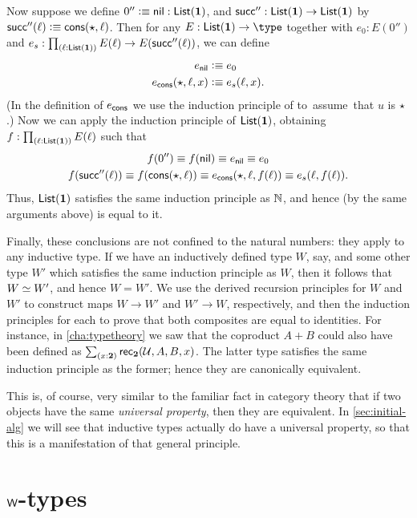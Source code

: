 Now suppose we define $0'' \vcentcolon\equiv \mathsf{nil}: \mathsf{List}(\mathbf{1})$, and $\mathsf{succ}'':\mathsf{List}(\mathbf{1})\to\mathsf{List}(\mathbf{1})$ by $\mathsf{succ}''(\ell) \vcentcolon\equiv \mathsf{cons}(\star,\ell)$.
Then for any $E:\lst\unit\to\type$ together with $e_0:E(0'')$ and $e_s:\prd{\ell:\lst\unit} E(\ell) \to E(\suc''(\ell))$, we can define
\begin{align*}
  e_{\mathsf{nil}} &\vcentcolon\equiv e_0\\
  e_{\mathsf{cons}}(\star,\ell,x) &\vcentcolon\equiv e_s(\ell,x).
\end{align*}
(In the definition of $e_{\mathsf{cons}}$ we use the induction principle of \unit to assume that $u$ is $\star$.)
Now we can apply the induction principle of $\mathsf{List}(\mathbf{1})$, obtaining $f:\prd{\ell:\lst\unit} E(\ell)$ such that
\begin{gather*}
  f(0'') \equiv f(\mathsf{nil}) \equiv e_{\mathsf{nil}} \equiv e_0\\
  f(\mathsf{succ}''(\ell)) \equiv f(\mathsf{cons}(\star,\ell)) \equiv e_{\mathsf{cons}}(\star,\ell,f(\ell)) \equiv e_s(\ell,f(\ell)).
\end{gather*}
Thus, $\mathsf{List}(\mathbf{1})$ satisfies the same induction principle as $\mathbb{N}$, and hence (by the same arguments above) is equal to it.

Finally, these conclusions are not confined to the natural numbers: they apply to any inductive type.
If we have an inductively defined type $W$, say, and some other type $W'$ which satisfies the same induction principle as $W$, then it follows that $W \simeq W'$, and hence $W=W'$.
We use the derived recursion principles for $W$ and $W'$ to construct maps $W\to W'$ and $W'\to W$, respectively, and then the induction principles for each to prove that both composites are equal to identities.
For instance, in \cref{cha:typetheory} we saw that the coproduct $A+B$ could also have been defined as $\sm{x:\bool} \rec{\bool}(\UU,A,B,x)$.
The latter type satisfies the same induction principle as the former; hence they are canonically equivalent.

This is, of course, very similar to the familiar fact in category theory that if two objects have the same \emph{universal property}, then they are equivalent.
In \cref{sec:initial-alg} we will see that inductive types actually do have a universal property, so that this is a manifestation of that general principle.


\section{\texorpdfstring{$\mathsf{W}$}{W}-types}
\label{sec:w-types}

